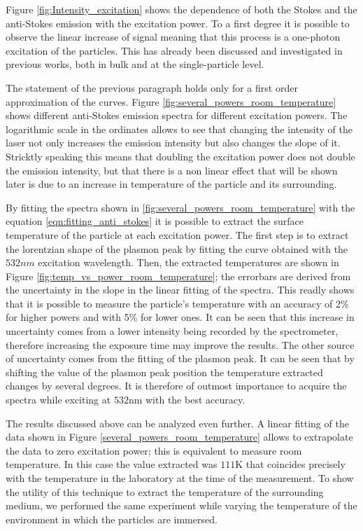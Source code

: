 \documentclass[twocolumn]{article}
\begin{document}
Figure \ref{fig:Intensity_excitation} shows the dependence of both the Stokes
and the anti-Stokes emission with the excitation power. To a first degree it is
possible to observe the linear increase of signal meaning that this process is a
one-photon excitation of the particles. This has already been discussed and
investigated in previous works, both in bulk and at the single-particle level. 

The statement of the previous paragraph holds only for a first order
approximation of the curves. Figure \ref{fig:several_powers_room_temperature}
shows different anti-Stokes emission spectra for different excitation powers.
The logarithmic scale in the ordinates allows to see that changing the intensity
of the laser not only increases the emission intensity but also changes the
slope of it. Stricktly speaking this means that doubling the excitation power
does not double the emission intensity, but that there is a non linear effect
that will be shown later is due to an increase in temperature of the particle
and its surrounding. 

By fitting the spectra shown in \ref{fig:several_powers_room_temperature} with
the equation \ref{eqn:fitting_anti_stokes} it is possible to extract the surface
temperature of the particle at each excitation power. The first step is to
extract the lorentzian shape of the plasmon peak by fitting the curve obtained
with the $532nm$ excitation wavelength. Then, the extracted temperatures are
shown in Figure \ref{fig:temp_vs_power_room_temperature}; the errorbars are
derived from the uncertainty in the slope in the linear fitting of the spectra.
This readly shows that it is possible to measure the particle's temperature with
an accuracy of 2\% for higher powers and with 5\% for lower ones. It can be seen
that this increase in uncertainty comes from a lower intensity being recorded by
the spectrometer, therefore increasing the exposure time may improve the
results. The other source of uncertainty comes from the fitting of the plasmon
peak. It can be seen that by shifting the value of the plasmon peak position the
temperature extracted changes by several degrees. It is therefore of outmost
importance to acquire the spectra while exciting at $532$nm with the best
accuracy. 

The results discussed above can be analyzed even further. A linear fitting of
the data shown in Figure \ref{several_powers_room_temperature} allows to extrapolate
the data to zero excitation power; this is equivalent to measure room
temperature. In this case the value extracted was $111$K that coincides
precisely with the temperature in the laboratory at the time of the measurement.
To show the utility of this technique to extract the temperature of the
surrounding medium, we performed the same experiment while varying the
temperature of the environment in which the particles are immersed. 
\end{document}
